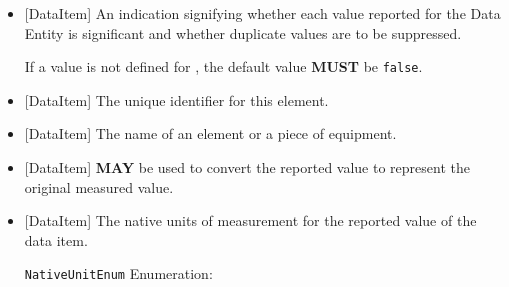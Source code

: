 \begin{itemize}
\item {}[DataItem] \newline An indication signifying whether each value reported for the \gls{Data Entity} is significant and whether duplicate values are to be suppressed.

If a value is not defined for , the default value \textbf{MUST} be \texttt{false}.

\item {}[DataItem] \newline The unique identifier for this element.

\item {}[DataItem] \newline The name of an element or a piece of equipment.

\item {}[DataItem] \newline {} \textbf{MAY} be used to convert the reported value to represent the original measured value.

\item {}[DataItem] \newline The native units of measurement for the reported value of the data item.

\texttt{NativeUnitEnum} Enumeration:


\end{itemize}
